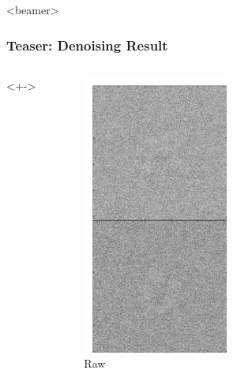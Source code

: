 \documentclass{beamer}
\begin{document}
\begin{frame}<beamer>
\frametitle{Teaser: Denoising Result}
\begin{columns}<+->

\begin{figure}
\centering
\includegraphics[width=.9 \columnwidth]{figures/deneg_raw.png}
\caption{Raw}
\end{figure}


\end{columns}
\end{frame}
\end{document}
